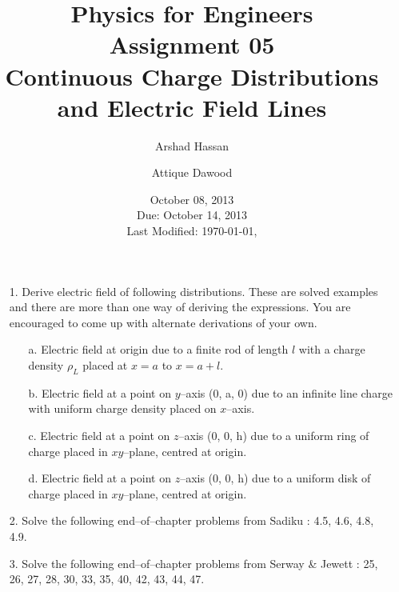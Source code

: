 \documentclass[12pt,a4paper]{article}
\title{\vspace{-3cm}Physics for Engineers\\Assignment 05\\Continuous Charge Distributions and Electric Field Lines}
\author{Arshad Hassan\and Attique Dawood}
\date{October 08, 2013\\Due: October 14, 2013\\[0.2cm] Last Modified: \today, \currenttime}
\begin{document}
\maketitle
\begin{itemize}
\item[1.] Derive electric field of following distributions. These are solved examples and there are more than one way of deriving the expressions. You are encouraged to come up with alternate derivations of your own.
\begin{itemize}
\item[a.] Electric field at origin due to a finite rod of length $l$ with a charge density $\rho_L$ placed at $x=a$ to $x=a+l$.
\item[b.] Electric field at a point on $y$--axis (0, a, 0) due to an infinite line charge with uniform charge density placed on $x$--axis.
\item[c.] Electric field at a point on $z$--axis (0, 0, h) due to a uniform ring of charge placed in $xy$--plane, centred at origin.
\item[d.] Electric field at a point on $z$--axis (0, 0, h) due to a uniform disk of charge placed in $xy$--plane, centred at origin.
\end{itemize}
\item[2.] Solve the following end--of--chapter problems from Sadiku \cite[Ch. 4, pg. 155]{Sadiku}: 4.5, 4.6, 4.8, 4.9.
\item[3.] Solve the following end--of--chapter problems from Serway \& Jewett \cite[Ch. 23, pg. 732--734]{Serway}: 25, 26, 27, 28, 30, 33, 35, 40, 42, 43, 44, 47.
\end{itemize}


\end{document}
